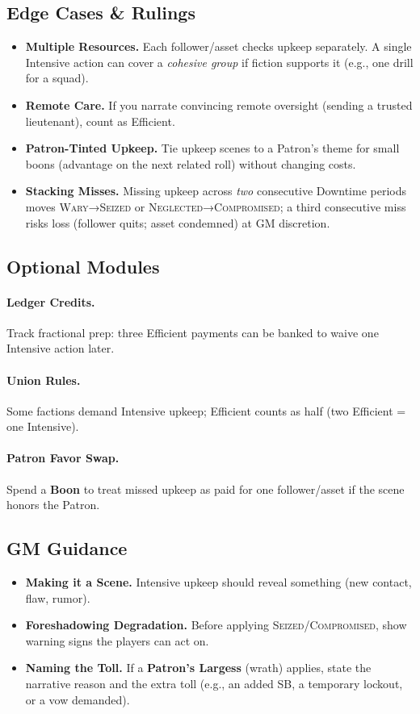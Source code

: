 \subsection{Edge Cases \& Rulings}\label{subsec:upkeep-edge}
\begin{itemize}
\item \textbf{Multiple Resources.} Each follower/asset checks upkeep separately. A single Intensive action can cover a \emph{cohesive group} if fiction supports it (e.g., one drill for a squad).
\item \textbf{Remote Care.} If you narrate convincing remote oversight (sending a trusted lieutenant), count as Efficient.
\item \textbf{Patron-Tinted Upkeep.} Tie upkeep scenes to a Patron's theme for small boons (advantage on the next related roll) without changing costs.
\item \textbf{Stacking Misses.} Missing upkeep across \emph{two} consecutive Downtime periods moves \textsc{Wary}→\textsc{Seized} or \textsc{Neglected}→\textsc{Compromised}; a third consecutive miss risks loss (follower quits; asset condemned) at GM discretion.
\end{itemize}

\subsection{Optional Modules}\label{subsec:upkeep-modules}
\paragraph{Ledger Credits.} Track fractional prep: three Efficient payments can be banked to waive one Intensive action later.
\paragraph{Union Rules.} Some factions demand Intensive upkeep; Efficient counts as half (two Efficient = one Intensive).
\paragraph{Patron Favor Swap.} Spend a \textbf{Boon} to treat missed upkeep as paid for one follower/asset if the scene honors the Patron.

\subsection{GM Guidance}\label{subsec:upkeep-gm}
\begin{itemize}
\item \textbf{Making it a Scene.} Intensive upkeep should reveal something (new contact, flaw, rumor).
\item \textbf{Foreshadowing Degradation.} Before applying \textsc{Seized}/\textsc{Compromised}, show warning signs the players can act on.
\item \textbf{Naming the Toll.} If a \textbf{Patron's Largess} (wrath) applies, state the narrative reason and the extra toll (e.g., an added SB, a temporary lockout, or a vow demanded).
\end{itemize}

